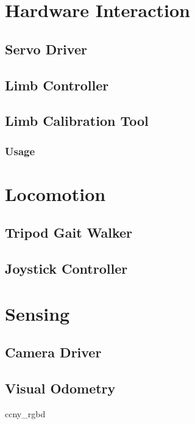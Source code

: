\documentclass{l4proj}
\begin{document}
\section{Hardware Interaction}

\subsection{Servo Driver}

\subsection{Limb Controller}

\subsection{Limb Calibration Tool}
\subsubsection{Usage}


\section{Locomotion}

\subsection{Tripod Gait Walker}
\subsection{Joystick Controller}

\section{Sensing}

\subsection{Camera Driver}
\subsection{Visual Odometry}
ccny\_rgbd \cite{ccny_rgbd}
\end{document}
